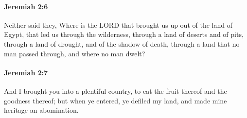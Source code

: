 		\paragraph{Jeremiah 2:6} %
			\label{JEREMIAH-2-6}

			Neither said they, Where is the LORD that brought us up out of the land of Egypt, that led us through the wilderness, through a land of deserts and of pits, through a land of drought, and of the shadow of death, through a land that no man passed through, and where no man dwelt?


		\paragraph{Jeremiah 2:7} %
			\label{JEREMIAH-2-7}

			And I brought you into a plentiful country, to eat the fruit thereof and the goodness thereof; but when ye entered, ye defiled my land, and made mine heritage an abomination.


